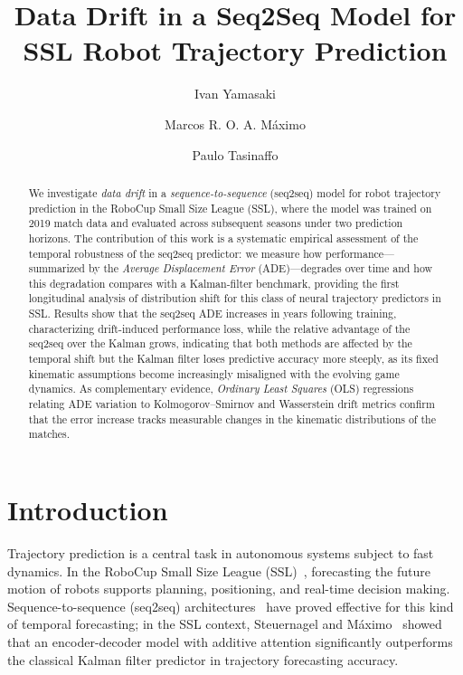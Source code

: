 \documentclass[runningheads]{llncs}
\begin{document}
\title{Data Drift in a Seq2Seq Model for SSL Robot Trajectory Prediction}

\author{Ivan Yamasaki\orcidID{} \and
Marcos R. O. A. M\'aximo \and
Paulo Tasinaffo\orcidID{}}
%
%
%
\maketitle

\begin{abstract}
We investigate \textit{data drift} in a \textit{sequence-to-sequence} (seq2seq) model for robot trajectory prediction in the RoboCup Small Size League (SSL), where the model was trained on 2019 match data and evaluated across subsequent seasons under two prediction horizons. The contribution of this work is a systematic empirical assessment of the temporal robustness of the seq2seq predictor: we measure how performance---summarized by the \textit{Average Displacement Error} (ADE)---degrades over time and how this degradation compares with a Kalman-filter benchmark, providing the first longitudinal analysis of distribution shift for this class of neural trajectory predictors in SSL. Results show that the seq2seq ADE increases in years following training, characterizing drift-induced performance loss, while the relative advantage of the seq2seq over the Kalman grows, indicating that both methods are affected by the temporal shift but the Kalman filter loses predictive accuracy more steeply, as its fixed kinematic assumptions become increasingly misaligned with the evolving game dynamics. As complementary evidence, \textit{Ordinary Least Squares} (OLS) regressions relating ADE variation to Kolmogorov--Smirnov and Wasserstein drift metrics confirm that the error increase tracks measurable changes in the kinematic distributions of the matches.
\end{abstract}

\section{Introduction}

Trajectory prediction is a central task in autonomous systems subject to fast dynamics. In the RoboCup Small Size League (SSL)~\cite{kitano1997}, forecasting the future motion of robots supports planning, positioning, and real-time decision making. Sequence-to-sequence (seq2seq) architectures~\cite{sutskever} have proved effective for this kind of temporal forecasting; in the SSL context, Steuernagel and M\'aximo~\cite{seq2seq} showed that an encoder-decoder model with additive attention significantly outperforms the classical Kalman filter predictor in trajectory forecasting accuracy.
\end{document}

